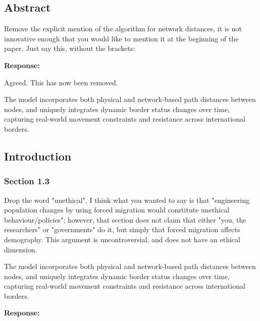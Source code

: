 \documentclass[11pt,a4paper]{article}
\begin{document}
\subsection*{Abstract}

\begin{reviewbox}
Remove the explicit mention of the algorithm for network distances, it is not innovative enough that you would like to mention it at the beginning of the paper. Just say this, without the brackets:
\end{reviewbox}

\textbf{Response:}

Agreed. This has now been removed.

\vspace{0.5cm}

\begin{updatebox}
The model 
incorporates both physical and network-based path distances between nodes, and uniquely 
integrates dynamic border status changes over time, capturing real-world movement constraints and resistance across 
international borders. 
\end{updatebox}

\vspace{0.5cm}

\subsection*{Introduction}

\subsubsection*{Section 1.3}

\begin{reviewbox}
Drop the word "unethical", I think what you wanted to say is that "engineering population changes by using forced migration would constitute unethical behaviour/policies"; however, that section does not claim that either "you, the researchers" or "governments" do it, but simply that forced migration affects demography. This argument is uncontroversial, and does not have an ethical dimension.

The model incorporates both physical and network-based path distances between
nodes, and uniquely integrates dynamic border status changes over time, capturing
real-world movement constraints and resistance across international borders.
\end{reviewbox}

\textbf{Response:}
\end{document}

